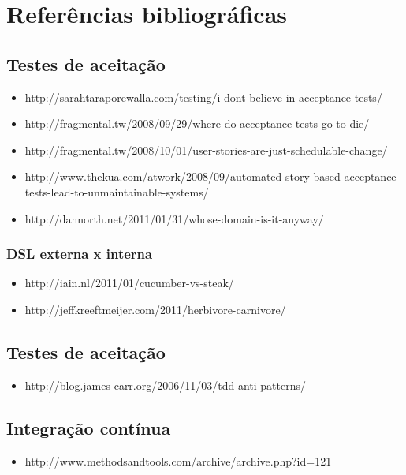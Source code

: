 \chapter{Referências bibliográficas}

\section{Testes de aceitação}
    \begin{itemize}
    \item http://sarahtaraporewalla.com/testing/i-dont-believe-in-acceptance-tests/
    \item http://fragmental.tw/2008/09/29/where-do-acceptance-tests-go-to-die/
    \item http://fragmental.tw/2008/10/01/user-stories-are-just-schedulable-change/
    \item http://www.thekua.com/atwork/2008/09/automated-story-based-acceptance-tests-lead-to-unmaintainable-systems/
    \item http://dannorth.net/2011/01/31/whose-domain-is-it-anyway/
    \end{itemize}

\subsection{DSL externa x interna}
    \begin{itemize}
    \item http://iain.nl/2011/01/cucumber-vs-steak/
    \item http://jeffkreeftmeijer.com/2011/herbivore-carnivore/
    \end{itemize}

\section{Testes de aceitação}
    \begin{itemize}
    \item http://blog.james-carr.org/2006/11/03/tdd-anti-patterns/
    \end{itemize}

\section{Integração contínua}
    \begin{itemize}
    \item http://www.methodsandtools.com/archive/archive.php?id=121
    \end{itemize}
